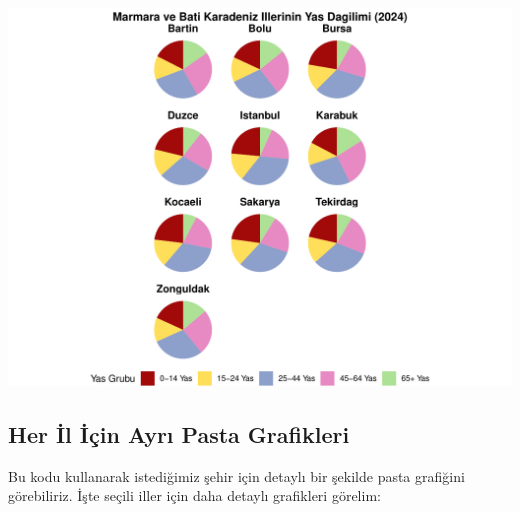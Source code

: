 \documentclass[
]{article}
\begin{document}
\begin{center}\includegraphics[width=0.8\linewidth]{cigdem_ucar_Rmarkdown_odevi_files/figure-latex/pasta-grafikleri-1} \end{center}

\subsection{Her İl İçin Ayrı Pasta
Grafikleri}\label{her-il-iuxe7in-ayrux131-pasta-grafikleri}

Bu kodu kullanarak istediğimiz şehir için detaylı bir şekilde pasta
grafiğini görebiliriz. İşte seçili iller için daha detaylı grafikleri
görelim:
\end{document}
